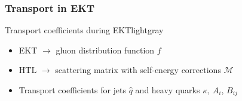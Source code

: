 \documentclass[aspectratio=169,11pt,usenames,dvipsnames]{beamer}
\begin{document}
\begin{frame}
    \frametitle{Transport in EKT}
        \begin{center}
            \begin{custombox2}{Transport coefficients during EKT}{lightgray}
            \small
            \begin{varwidth}{0.67\textwidth}
            \begin{itemize}\itemsep0em 
                \item {\color{palteal}EKT} $\rightarrow$ gluon distribution function $f$\\
                \item {\color{palteal}HTL} $\rightarrow$ scattering matrix with self-energy corrections $\mathcal{M}$\\
                \item Transport coefficients for jets {\color{pinky}$\hat{q}$} and heavy quarks {\color{pinky}$\kappa$}, {\color{pinky}$A_i$}, {\color{pinky}$B_{ij}$}
            \end{itemize}
            \end{varwidth}
        \end{custombox2}
        \end{center}

\end{frame}
\end{document}
